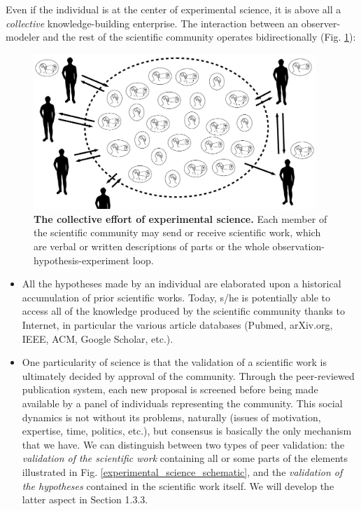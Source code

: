 Even if the individual is at the center of experimental science, it is above all a \textit{collective} knowledge-building enterprise. The interaction between an observer-modeler and the rest of the scientific community operates bidirectionally (Fig. \ref{experimental_science_schematic_communauty}):
\begin{figure}
\begin{center}
\includegraphics[width=0.95\textwidth]{../../images/experimental_science/experimental_science_communauty2.png}
\end{center}
\caption{\textbf{The collective effort of experimental science.} Each member of the scientific community may send or receive scientific work, which are verbal or written descriptions of parts or the whole observation-hypothesis-experiment loop.}
\label{experimental_science_schematic_communauty}
\end{figure}
\begin{itemize}
	\item All the hypotheses made by an individual are elaborated upon a historical accumulation of prior scientific works. Today, s/he is potentially able to access all of the knowledge produced by the scientific community thanks to Internet, in particular the various article databases (Pubmed, arXiv.org, IEEE, ACM, Google Scholar, etc.).
	\item One particularity of science is that the validation of a scientific work is ultimately decided by approval of the community. Through the peer-reviewed publication system, each new proposal is screened before being made available by a panel of individuals representing the community. This social dynamics is not without its problems, naturally (issues of motivation, expertise, time, politics, etc.), but consensus is basically the only mechanism that we have. We can distinguish between two types of peer validation: the \textit{validation of the scientific work} containing all or some parts of the elements illustrated in Fig. \ref{experimental_science_schematic}, and the \textit{validation of the hypotheses} contained in the scientific work itself. We will develop the latter aspect in Section 1.3.3.
\end{itemize}


